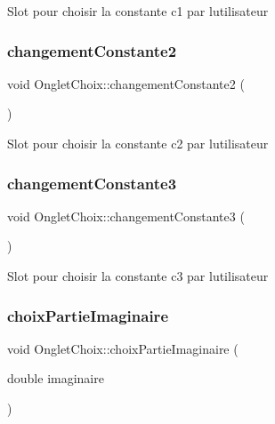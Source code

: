 Slot pour choisir la constante c1 par l\textquotesingle{}utilisateur \mbox{\label{classOngletChoix_a015b22df95995cc3bcec783dc62d5af0}} 
\subsubsection{\texorpdfstring{changement\+Constante2}{changementConstante2}}
{\footnotesize\ttfamily void Onglet\+Choix\+::changement\+Constante2 (\begin{DoxyParamCaption}{ }\end{DoxyParamCaption})\hspace{0.3cm}{\ttfamily [slot]}}

Slot pour choisir la constante c2 par l\textquotesingle{}utilisateur \mbox{\label{classOngletChoix_a67fe19298a58a01c36415466597ddb74}} 
\subsubsection{\texorpdfstring{changement\+Constante3}{changementConstante3}}
{\footnotesize\ttfamily void Onglet\+Choix\+::changement\+Constante3 (\begin{DoxyParamCaption}{ }\end{DoxyParamCaption})\hspace{0.3cm}{\ttfamily [slot]}}

Slot pour choisir la constante c3 par l\textquotesingle{}utilisateur \mbox{\label{classOngletChoix_ac3e007ccd43b21ab632cb4fe270e5ef6}} 
\subsubsection{\texorpdfstring{choix\+Partie\+Imaginaire}{choixPartieImaginaire}}
{\footnotesize\ttfamily void Onglet\+Choix\+::choix\+Partie\+Imaginaire (\begin{DoxyParamCaption}\item[{double}]{imaginaire }\end{DoxyParamCaption})\hspace{0.3cm}{\ttfamily [slot]}}

